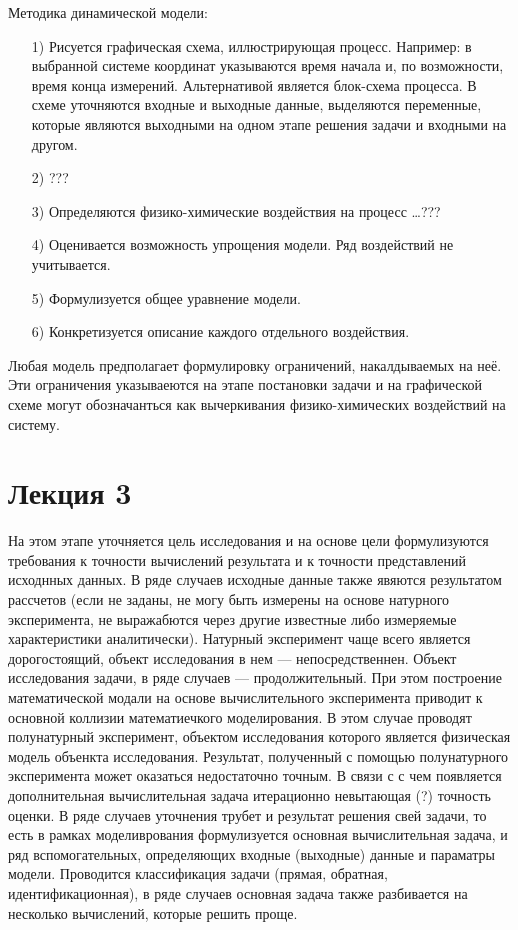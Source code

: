 \documentclass[12pt]{article}
\begin{document}
Методика динамической модели:
\begin{enumerate}
    \item[1)] Рисуется графическая схема, иллюстрирующая процесс. Например: в выбранной системе координат указываются время начала и, по возможности, время конца измерений. Альтернативой является блок-схема процесса. В схеме уточняются входные и выходные данные, выделяются переменные, которые являются выходными на одном этапе решения задачи и входными на другом.
    \item[2)] ???
    \item[3)] Определяются физико-химические воздействия на процесс \ldots ???
    \item[4)] Оценивается возможность упрощения модели. Ряд воздействий не учитывается.
    \item[5)] Формулизуется общее уравнение модели.
    \item[6)] Конкретизуется описание каждого отдельного воздействия.
\end{enumerate}

Любая модель предполагает формулировку ограничений, накалдываемых на неё. Эти ограничения указываеются на этапе постановки задачи и на графической схеме могут обозначанться как вычеркивания физико-химических воздействий на систему.

\newpage
\section{Лекция 3}
На этом этапе уточняется цель исследования и на основе цели формулизуются требования к точности вычислений результата и к точности представлений исходнных данных. В ряде случаев исходные данные также явяются результатом рассчетов (если не заданы, не могу быть измерены на основе натурного эксперимента, не выражабются через другие известные либо измеряемые характеристики аналитически). Натурный эксперимент чаще всего является дорогостоящий, объект исследования в нем --- непосредственнен. Объект исследования задачи, в ряде случаев --- продолжительный. При этом построение математической модали на основе вычислительного эксперимента приводит к основной коллизии математиечкого моделирования. В этом случае проводят полунатурный эксперимент, объектом  исследования которого является физическая модель объенкта исследования. Результат, полученный с помощью полунатурного  эксперимента может оказаться недостаточно точным. В связи с с чем появляется дополнительная вычислительная задача итерационно невытающая (?) точность оценки. В ряде случаев уточнения трубет и результат решения свей задачи, то есть в рамках моделиврования формулизуется основная вычислительная задача, и ряд вспомогательных, определяющих входные (выходные) данные и параматры модели. Проводится классификация задачи (прямая, обратная, идентификационная), в ряде случаев основная задача также разбивается на несколько вычислений, которые решить проще.
\end{document}

